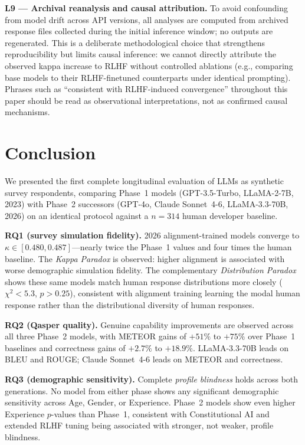 \documentclass[sigconf,nonacm]{acmart}
\newcommand{\kp}{\textit{Kappa Paradox}\xspace}
\newcommand{\distrpar}{\textit{Distribution Paradox}\xspace}
\newcommand{\pb}{\textit{profile blindness}\xspace}
\begin{document}
\textbf{L9 --- Archival reanalysis and causal attribution.}
To avoid confounding from model drift across API versions, all analyses
are computed from archived response files collected during the initial
inference window; no outputs are regenerated.
This is a deliberate methodological choice that strengthens reproducibility
but limits causal inference: we cannot directly attribute the observed
kappa increase to RLHF without controlled ablations (e.g., comparing
base models to their RLHF-finetuned counterparts under identical prompting).
Phrases such as ``consistent with RLHF-induced convergence'' throughout
this paper should be read as observational interpretations, not as
confirmed causal mechanisms.

\section{Conclusion}
\label{sec:conclusion}

We presented the first complete longitudinal evaluation of LLMs as synthetic
survey respondents, comparing Phase~1 models (GPT-3.5-Turbo, LLaMA-2-7B,
2023) with Phase~2 successors (GPT-4o, Claude Sonnet~4-6, LLaMA-3.3-70B,
2026) on an identical protocol against a $n{=}314$ human developer baseline.

\textbf{RQ1 (survey simulation fidelity).}
2026 alignment-trained models converge to $\kappa \in [0.480, 0.487]$---nearly
twice the Phase~1 values and four times the human baseline.
The \kp is observed: higher alignment is associated with worse demographic
simulation fidelity.
The complementary \distrpar shows these same models match human response
distributions more closely ($\chi^2 < 5.3$, $p > 0.25$), consistent with
alignment training learning the modal human response rather than the
distributional diversity of human responses.

\textbf{RQ2 (Qasper quality).}
Genuine capability improvements are observed across all three Phase~2 models,
with METEOR gains of $+51\%$ to $+75\%$ over Phase~1 baselines and
correctness gains of $+2.7\%$ to $+18.9\%$.
LLaMA-3.3-70B leads on BLEU and ROUGE; Claude Sonnet~4-6 leads on METEOR
and correctness.

\textbf{RQ3 (demographic sensitivity).}
Complete \pb holds across both generations.
No model from either phase shows any significant demographic sensitivity
across Age, Gender, or Experience.
Phase~2 models show even higher Experience $p$-values than Phase~1,
consistent with Constitutional AI and extended RLHF tuning being
associated with stronger, not weaker, profile blindness.
\end{document}
